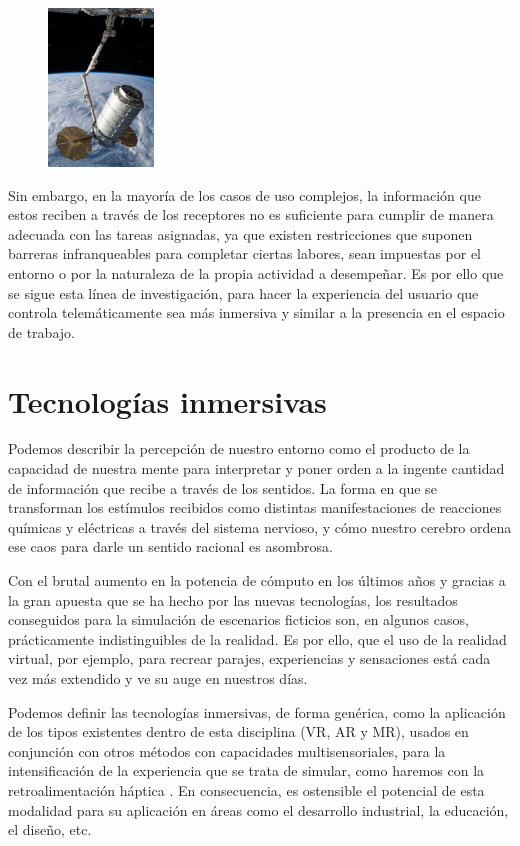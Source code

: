 \begin{figure}[hbt]
    \centering
    \includegraphics[width=0.25\textwidth]{imagenes/canadarm2.jpg}
    \caption{\cite{81}}
    \label{fig:canadarm}
\end{figure}

Sin embargo, en la mayoría de los casos de uso complejos, la información que estos reciben a través de los receptores no es suficiente para cumplir de manera adecuada con las tareas asignadas, ya que existen restricciones que suponen barreras infranqueables para completar ciertas labores, sean impuestas por el entorno o por la naturaleza de la propia actividad a desempeñar. Es por ello que se sigue esta línea de investigación, para hacer la experiencia del usuario que controla telemáticamente sea más inmersiva y similar a la presencia en el espacio de trabajo. 


\section{Tecnologías inmersivas}
Podemos describir la percepción de nuestro entorno como el producto de la capacidad de nuestra mente para interpretar y poner orden a la ingente cantidad de información que recibe a través de los sentidos. La forma en que se transforman los estímulos recibidos como distintas manifestaciones de reacciones químicas y eléctricas a través del sistema nervioso, y cómo nuestro cerebro ordena ese caos para darle un sentido racional es asombrosa.

Con el brutal aumento en la potencia de cómputo en los últimos años y gracias a la gran apuesta que se ha hecho por las nuevas tecnologías, los resultados conseguidos para la simulación de escenarios ficticios son, en algunos casos, prácticamente indistinguibles de la realidad. Es por ello, que el uso de la realidad virtual, por ejemplo, para recrear parajes, experiencias y sensaciones está cada vez más extendido y ve su auge en nuestros días.

Podemos definir las tecnologías inmersivas, de forma genérica, como la aplicación de los tipos existentes dentro de esta disciplina (VR, AR y MR), usados en conjunción con otros métodos con capacidades multisensoriales, para la intensificación de la experiencia que se trata de simular, como haremos con la retroalimentación háptica \cite{91}. En consecuencia, es ostensible el potencial de esta modalidad para su aplicación en áreas como el desarrollo industrial, la educación, el diseño, etc.

